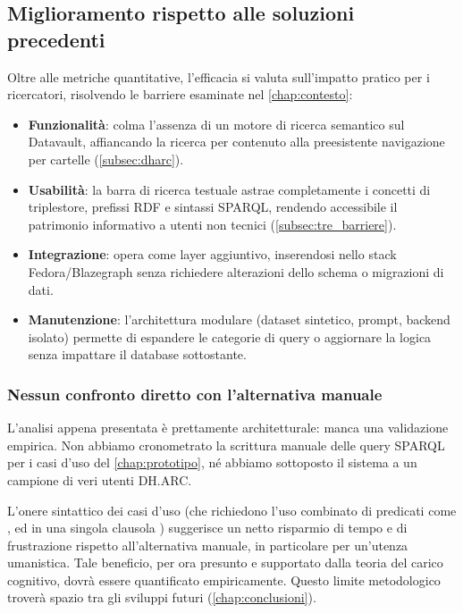 \subsection{Miglioramento rispetto alle soluzioni precedenti}\label{subsec:miglioramento}

Oltre alle metriche quantitative, l'efficacia si valuta sull'impatto pratico per i ricercatori, risolvendo le barriere esaminate nel \cref{chap:contesto}:

\begin{sloppypar}
\begin{itemize}
    \item \textbf{Funzionalità}: colma l'assenza di un motore di ricerca semantico sul Datavault, affiancando la ricerca per contenuto alla preesistente navigazione per cartelle (\cref{subsec:dharc}).
    \item \textbf{Usabilità}: la barra di ricerca testuale astrae completamente i concetti di triplestore, prefissi RDF e sintassi SPARQL, rendendo accessibile il patrimonio informativo a utenti non tecnici (\cref{subsec:tre_barriere}).
    \item \textbf{Integrazione}: opera come layer aggiuntivo, inserendosi nello stack Fedora/Blazegraph senza richiedere alterazioni dello schema o migrazioni di dati.
    \item \textbf{Manutenzione}: l'architettura modulare (dataset sintetico, prompt, backend isolato) permette di espandere le categorie di query o aggiornare la logica senza impattare il database sottostante.
\end{itemize}
\end{sloppypar}

\subsubsection{Nessun confronto diretto con l'alternativa manuale}

L'analisi appena presentata è prettamente architetturale: manca una validazione empirica. Non abbiamo cronometrato la scrittura manuale delle query SPARQL per i casi d'uso del \cref{chap:prototipo}, né abbiamo sottoposto il sistema a un campione di veri utenti DH.ARC.\@

L'onere sintattico dei casi d'uso (che richiedono l'uso combinato di predicati come ,  ed  in una singola clausola ) suggerisce un netto risparmio di tempo e di frustrazione rispetto all'alternativa manuale, in particolare per un'utenza umanistica. Tale beneficio, per ora presunto e supportato dalla teoria del carico cognitivo, dovrà essere quantificato empiricamente. Questo limite metodologico troverà spazio tra gli sviluppi futuri (\cref{chap:conclusioni}).

